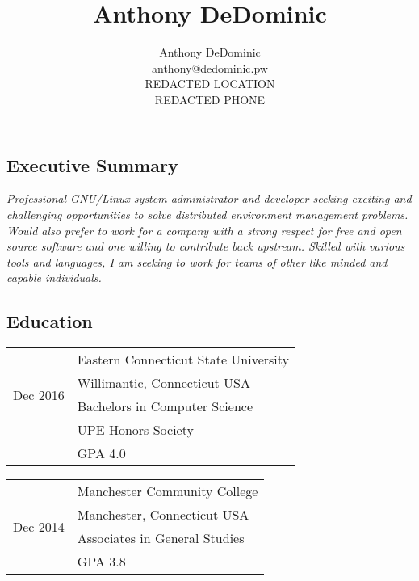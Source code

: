 \documentclass[10pt,letterpaper,]{article}
\author{Anthony DeDominic\\anthony@dedominic.pw\\REDACTED LOCATION\\REDACTED PHONE}
\title{Anthony DeDominic}
\begin{document}

\subsection{Executive Summary}\label{about}

\emph{Professional GNU/Linux system administrator and developer seeking
exciting and challenging opportunities to solve distributed environment
management problems. Would also prefer to work for a company with
a strong respect for free and open source software and one willing to
contribute back upstream. Skilled with various tools and languages, 
I am seeking to work for teams of other like minded and capable individuals.}

\subsection{Education}\label{education}

\begin{table}[!h]
    \begin{minipage}{0.5\linewidth}
    \centering
    \begin{tabular}{l|l}
        \multirow{4}{*}{Dec 2016}
        & Eastern Connecticut State University \\
        & Willimantic, Connecticut USA \\
        & Bachelors in Computer Science \\
        & UPE Honors Society \\
        & GPA 4.0 \\
    \end{tabular}
    \end{minipage}
    \begin{minipage}{0.5\linewidth}
    \centering
    \begin{tabular}{l|l}
        \multirow{4}{*}{Dec 2014} 
        & Manchester Community College \\
        & Manchester, Connecticut USA \\
        & Associates in General Studies \\
        & GPA 3.8 \\
    \end{tabular}
    \end{minipage}
\end{table}
\end{document}
